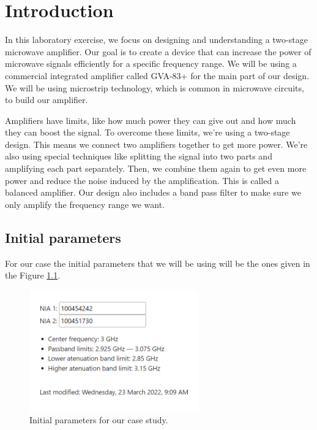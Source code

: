 \documentclass[12pt]{report} %
\let\oldsection\section
\renewcommand\section{\clearpage\oldsection}
\begin{document}
\chapter{Introduction}

In this laboratory exercise, we focus on designing and understanding a two-stage microwave amplifier. Our goal is to create a device that can increase the power of microwave signals efficiently for a specific frequency range. We will be using a commercial integrated amplifier called GVA-83+ for the main part of our design. We will be using microstrip technology, which is common in microwave circuits, to build our amplifier.

Amplifiers have limits, like how much power they can give out and how much they can boost the signal. To overcome these limits, we're using a two-stage design. This means we connect two amplifiers together to get more power. We're also using special techniques like splitting the signal into two parts and amplifying each part separately. Then, we combine them again to get even more power and reduce the noise induced by the amplification. This is called a balanced amplifier. Our design also includes a band pass filter to make sure we only amplify the frequency range we want. 

\section{Initial parameters}

For our case the initial parameters that we will be using will be the ones given in the Figure \ref{fig:introduction:initial_parameters}.

\begin{figure}[htbp]
    \centering
    \includegraphics[width=0.65\textwidth]{introduction/initial_parameters_calculator.png}
    \caption{Initial parameters for our case study.}
    \label{fig:introduction:initial_parameters}
\end{figure}
\end{document}
